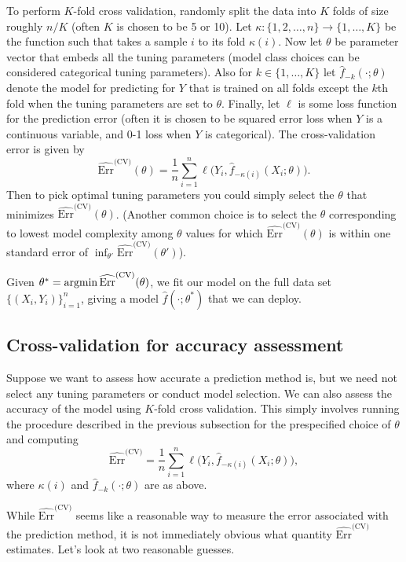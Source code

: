 To perform $K$-fold cross validation, randomly split the data into $K$ folds of size roughly $n/K$ (often $K$ is chosen to be 5 or 10). Let $\kappa: \{1,2,\dots, n \} \to \{1,\dots,K \}$ be the function such that takes a sample $i$ to its fold $\kappa(i)$. Now let $\theta$ be parameter vector that embeds all the tuning parameters (model class choices can be considered categorical tuning parameters). Also for $k \in \{1,\dots,K \}$ let $\hat{f}_{-k}( \cdot; \theta)$ denote the model for predicting for $Y$ that is trained on all folds except the $k$th fold when the tuning parameters are set to $\theta$. Finally, let $\ell$ is some loss function for the prediction error (often it is chosen to be squared error loss when $Y$ is a continuous variable, and 0-1 loss when $Y$ is categorical). The cross-validation error is given by $$\widehat{\text{Err}}^{\text{(CV)}}(\theta) = \frac{1}{n} \sum_{i=1}^n \ell \Big( Y_i, \hat{f}_{-\kappa(i)}( X_i; \theta) \Big).$$ 
Then to pick optimal tuning parameters you could simply select the $\theta$ that minimizes  $\widehat{\text{Err}}^{\text{(CV)}}(\theta)$. (Another common choice is to select the $\theta$ corresponding to lowest model complexity among $\theta$ values for which  $\widehat{\text{Err}}^{\text{(CV)}}(\theta)$ is within one standard error of $\inf_{\theta'} \widehat{\text{Err}}^{\text{(CV)}}(\theta')$). 

Given $\theta^* = \operatorname*{argmin} \widehat{\text{Err}}^{\text{(CV)}}(\theta)$, we fit our model on the full data set $\{(X_i,Y_i)\}_{i=1}^n$, giving a model $\hat{f}(\cdot;\theta^*)$ that we can deploy.

\subsection{Cross-validation for accuracy assessment}

Suppose we want to assess how accurate a prediction method is, but we need not select any tuning parameters or conduct model selection. We can also assess the accuracy of the model using $K$-fold cross validation. This simply involves running the procedure described in the previous subsection for the prespecified choice of $\theta$ and computing $$\widehat{\text{Err}}^{\text{(CV)}} = \frac{1}{n} \sum_{i=1}^n \ell \Big( Y_i, \hat{f}_{-\kappa(i)}( X_i;\theta) \Big),$$ where $\kappa(i)$ and $\hat{f}_{-k}(\cdot;\theta)$ are as above. 

While $\widehat{\text{Err}}^{\text{(CV)}}$ seems like a reasonable way to measure the error associated with the prediction method, it is not immediately obvious what quantity $\widehat{\text{Err}}^{\text{(CV)}}$ estimates. Let's look at two reasonable guesses.

